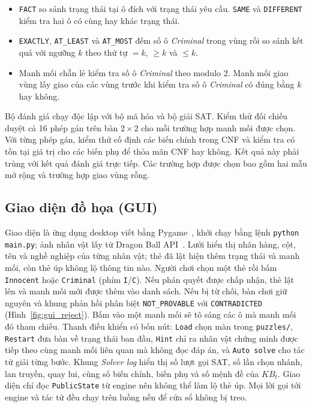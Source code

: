\documentclass[12pt,a4paper]{article}
\begin{document}
    \begin{itemize}
        \item \texttt{FACT} so sánh trạng thái tại ô đích với trạng thái yêu cầu. \texttt{SAME} và \texttt{DIFFERENT} kiểm tra hai ô có cùng hay khác trạng thái.
        \item \texttt{EXACTLY}, \texttt{AT\_LEAST} và \texttt{AT\_MOST} đếm số ô \emph{Criminal} trong vùng rồi so sánh kết quả với ngưỡng $k$ theo thứ tự $=k$, $\ge k$ và $\le k$.
        \item Manh mối chẵn lẻ kiểm tra số ô \emph{Criminal} theo modulo $2$. Manh mối giao vùng lấy giao của các vùng trước khi kiểm tra số ô \emph{Criminal} có đúng bằng $k$ hay không.
    \end{itemize}

    Bộ đánh giá chạy độc lập với bộ mã hóa và bộ giải SAT. Kiểm thử đối chiếu duyệt cả 16 phép gán trên bàn $2 \times 2$ cho mỗi trường hợp manh mối được chọn. Với từng phép gán, kiểm thử cố định các biến chính trong CNF và kiểm tra có tồn tại giá trị cho các biến phụ để thỏa mãn CNF hay không. Kết quả này phải trùng với kết quả đánh giá trực tiếp. Các trường hợp được chọn bao gồm hai mẫu mở rộng và trường hợp giao vùng rỗng.

    \subsection{Giao diện đồ họa (GUI)}
Giao diện là ứng dụng desktop viết bằng Pygame~\cite{pygame}, khởi chạy bằng lệnh \texttt{python main.py}; ảnh nhân vật lấy từ Dragon Ball API~\cite{dragonball_api}. Lưới hiển thị nhãn hàng, cột, tên và nghề nghiệp của từng nhân vật; thẻ đã lật hiện thêm trạng thái và manh mối, còn thẻ úp không lộ thông tin nào. Người chơi chọn một thẻ rồi bấm \texttt{Innocent} hoặc \texttt{Criminal} (phím \texttt{I}/\texttt{C}). Nếu phán quyết được chấp nhận, thẻ lật lên và manh mối mới được thêm vào danh sách. Nếu bị từ chối, bàn chơi giữ nguyên và khung phản hồi phân biệt \texttt{NOT\_PROVABLE} với \texttt{CONTRADICTED} (Hình~\ref{fig:gui_reject}). Bấm vào một manh mối sẽ tô sáng các ô mà manh mối đó tham chiếu. Thanh điều khiển có bốn nút: \texttt{Load} chọn màn trong \texttt{puzzles/}, \texttt{Restart} đưa bàn về trạng thái ban đầu, \texttt{Hint} chỉ ra nhân vật chứng minh được tiếp theo cùng manh mối liên quan mà không đọc đáp án, và \texttt{Auto solve} cho tác tử giải từng bước. Khung \emph{Solver log} hiển thị số lượt gọi SAT, số lần chọn nhánh, lan truyền, quay lui, cùng số biến chính, biến phụ và số mệnh đề của $KB_t$. Giao diện chỉ đọc \texttt{PublicState} từ engine nên không thể làm lộ thẻ úp. Mọi lời gọi tới engine và tác tử đều chạy trên luồng nền để cửa sổ không bị treo.
\end{document}
